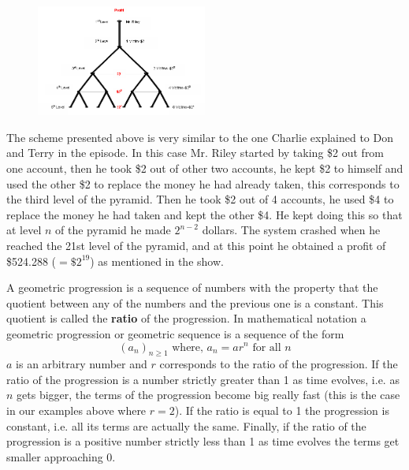 	\begin{figure}[H]
	   \centering
	   \includegraphics[width=0.5\textwidth]{season1/108/images/pyramid.png} 
	\end{figure}

 The scheme presented above is very similar to the one Charlie explained to Don and Terry in the episode. In this case Mr. Riley started by taking \$2 out from one account, then he took \$2 out of other two accounts, he kept \$2 to himself and used the other \$2 to replace the money he had already taken, this corresponds to the third level of the pyramid. Then he took \$2 out of 4 accounts, he used \$4 to replace the money he had taken and kept the other \$4. He kept doing this so that at level $n$ of the pyramid he made $2^{n-2}$ dollars. The system crashed when he reached the 21st level of the pyramid, and at this point he obtained a profit of \$524.288 ($=\$2^{19}$) as mentioned in the show. \\


A geometric progression is a sequence of numbers with the property that the quotient between any of the numbers and the previous one is a constant. This quotient is called the \textbf{ratio} of the progression. In mathematical notation a geometric progression or geometric sequence is a sequence of the form
	\[
	(a_n)_{n \geq 1} \text{ where, }a_n = ar^n \text{ for all }n
	\]
$a$ is an arbitrary number and $r$ corresponds to the ratio of the progression. If the ratio of the progression is a number strictly greater than 1 as time evolves, i.e. as $n$ gets bigger, the terms of the progression become big really fast (this is the case in our examples above where $r=2$). If the ratio is equal to 1 the progression is constant, i.e. all its terms are actually the same. Finally, if the ratio of the progression is a positive number strictly less than 1 as time evolves the terms get smaller approaching 0. \\

